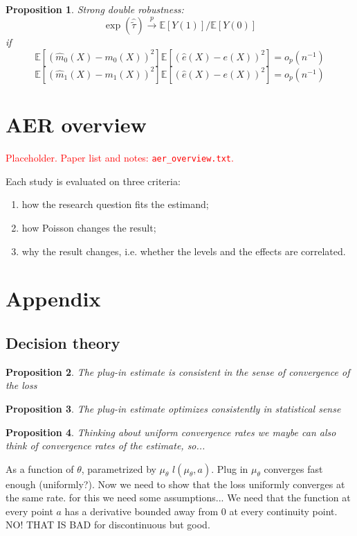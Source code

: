 \documentclass[a4paper,12pt]{article}
\theoremstyle{plain}
\newtheorem{prop}{Proposition}
\begin{document}
    \begin{prop}
    Strong double robustness:
    $$\exp(\hat{\tilde{\tau}}) \stackrel{p}{\to} \mathbb{E}[Y(1)] / \mathbb{E}[Y(0)]$$
    if
    $$\mathbb{E}[(\hat 
 m_0(X) - m_0(X))^2]\mathbb{E}[(\hat e(X) - e(X))^2]  = o_p(n^{-1})$$
    $$\mathbb{E}[(\hat m_1(X) - m_1(X))^2]\mathbb{E}[(\hat e(X) - e(X))^2] = o_p(n^{-1})$$
    \end{prop}

\section{AER overview}

\textcolor{red}{Placeholder. Paper list and notes: \texttt{aer\_overview.txt}.}

Each study is evaluated on three criteria:
\begin{enumerate}
    \item how the research question fits the estimand;
    \item how Poisson changes the result;
    \item why the result changes, i.e. whether the levels and the effects are correlated.
\end{enumerate}






\section{Appendix}

\subsection{Decision theory}

\begin{prop}
    The plug-in estimate is consistent in the sense of convergence of the loss
\end{prop}

\begin{prop}
    The plug-in estimate optimizes consistently in statistical sense
\end{prop}

\begin{prop}
    Thinking about uniform convergence rates we maybe can also think of convergence rates of the estimate, so...
\end{prop}

As a function of $\theta$, parametrized by $\mu_\theta$ $l(\mu_\theta, a)$. Plug in $\mu_\theta$ converges fast enough (uniformly?). Now we need to show that the loss uniformly converges at the same rate. for this we need some assumptions... We need that the function at every point $a$ has a derivative bounded away from 0 at every continuity point. NO! THAT IS BAD for discontinuous but good. 
\end{document}
